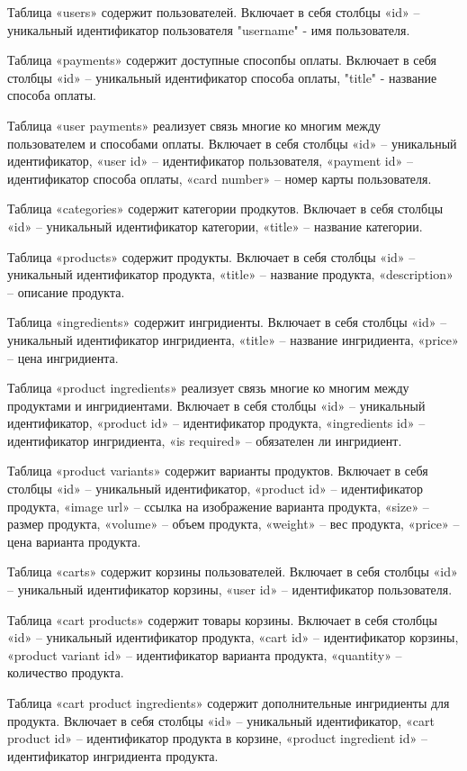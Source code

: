 \documentclass[a4paper,14pt]{extarticle}
\begin{document}
  Таблица «users» содержит пользователей. Включает в себя столбцы «id» -- уникальный идентификатор пользователя "username" - имя пользователя.

  Таблица «payments» содержит доступные спосопбы оплаты. Включает в себя столбцы «id» -- уникальный идентификатор способа оплаты, "title" - название способа оплаты.

  Таблица «user payments» реализует связь многие ко многим между пользователем и способами оплаты. Включает в себя столбцы «id» -- уникальный идентификатор, «user id» -- идентификатор пользователя, «payment id» -- идентификатор способа оплаты, «card number» -- номер карты пользователя.

  Таблица «categories» содержит категории продкутов. Включает в себя столбцы «id» -- уникальный идентификатор категории, «title» -- название категории.

  Таблица «products» содержит продукты. Включает в себя столбцы «id» -- уникальный идентификатор продукта, «title» -- название продукта, «description» -- описание продукта.

  Таблица «ingredients» содержит ингридиенты. Включает в себя столбцы «id» -- уникальный идентификатор ингридиента, «title» -- название ингридиента, «price» -- цена ингридиента.

  Таблица «product ingredients» реализует связь многие ко многим между продуктами и ингридиентами. Включает в себя столбцы «id» -- уникальный идентификатор, «product id» -- идентификатор продукта, «ingredients id» -- идентификатор ингридиента, «is required» -- обязателен ли ингридиент.

  Таблица «product variants» содержит варианты продуктов. Включает в себя столбцы «id» -- уникальный идентификатор, «product id» -- идентификатор продукта, «image url» -- ссылка на изображение варианта продукта, «size» -- размер продукта, «volume» -- объем продукта, «weight» -- вес продукта, «price» -- цена варианта продукта.

  Таблица «carts» содержит корзины пользователей. Включает в себя столбцы «id» -- уникальный идентификатор корзины, «user id» -- идентификатор пользователя.

  Таблица «cart products» содержит товары корзины. Включает в себя столбцы «id» -- уникальный идентификатор продукта, «cart id» -- идентификатор корзины, «product variant id» -- идентификатор варианта продукта, «quantity» -- количество продукта.

  Таблица «cart product ingredients» содержит дополнительные ингридиенты для продукта. Включает в себя столбцы «id» -- уникальный идентификатор, «cart product id» -- идентификатор продукта в корзине, «product ingredient id» -- идентификатор ингридиента продукта.
\end{document}
